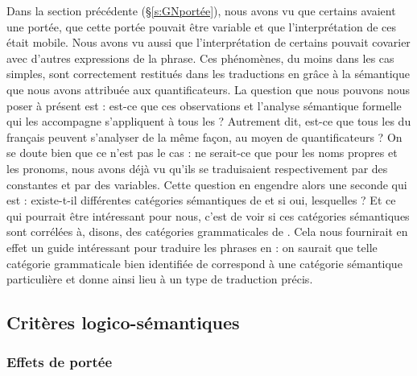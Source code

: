 Dans la section précédente (\S\ref{s:GNportée}), nous avons vu que
certains {\GN} avaient une portée, que cette portée pouvait
être variable et que l'interprétation de ces {\GN}
était mobile.  Nous avons vu aussi que l'interprétation de certains
{\GN} pouvait covarier avec d'autres expressions de la
phrase. Ces phénomènes, du moins dans les cas simples, sont
correctement restitués dans les traductions en {\LO} grâce à la
sémantique que nous avons attribuée aux quantificateurs. La question
que nous pouvons nous poser à présent est : est-ce que ces
observations et l'analyse sémantique formelle qui les accompagne
s'appliquent à tous les {\GN} ? Autrement dit, est-ce que
tous les {\GN} du français peuvent s'analyser de la même
façon, au moyen de quantificateurs ? On se doute bien que ce n'est pas
le cas : ne serait-ce que pour les noms propres et les pronoms, nous avons  déjà vu qu'ils se traduisaient respectivement par des
constantes et  par des variables. Cette question en
engendre alors une seconde qui est : existe-t-il différentes
catégories sémantiques de {\GN} et si oui, lesquelles ?  Et ce qui
pourrait être intéressant pour nous, c'est de voir si ces catégories
sémantiques sont corrélées à, disons, des catégories grammaticales de
\GN. Cela nous fournirait en effet un guide intéressant pour traduire
les phrases en {\LO} : on saurait que telle catégorie grammaticale
bien identifiée de
{\GN} correspond à une catégorie sémantique particulière et donne
ainsi lieu à un type de traduction précis.


\subsection{Critères logico-sémantiques}


\subsubsection{Effets de portée}
\label{sss:effportee}

